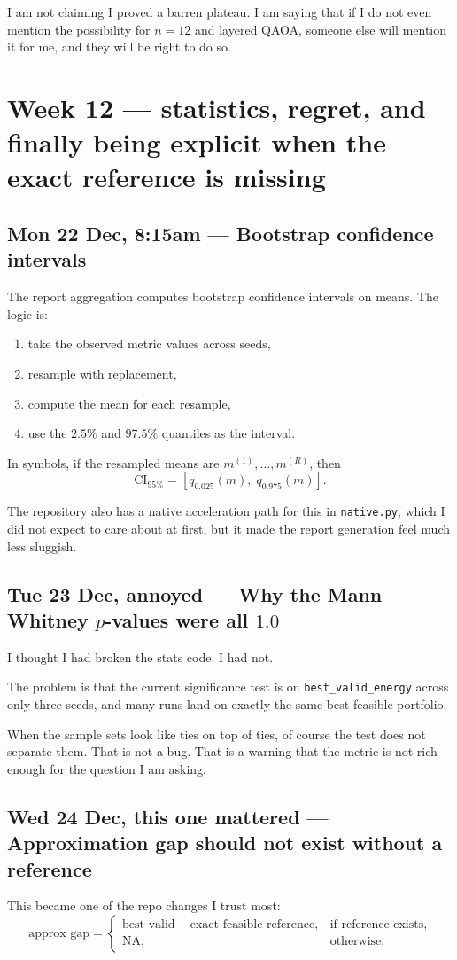 \documentclass[11pt]{article}
\newcommand{\entry}[2]{\subsection*{#1 --- #2}}
\newcommand{\repo}[1]{\texttt{#1}}
\begin{document}
I am not claiming I proved a barren plateau.
I am saying that if I do not even mention the possibility for \(n=12\) and layered QAOA, someone
else will mention it for me, and they will be right to do so.

\section*{Week 12 --- statistics, regret, and finally being explicit when the exact reference is missing}

\entry{Mon 22 Dec, 8:15am}{Bootstrap confidence intervals}

The report aggregation computes bootstrap confidence intervals on means.
The logic is:
\begin{enumerate}[leftmargin=1.4em]
\item take the observed metric values across seeds,
\item resample with replacement,
\item compute the mean for each resample,
\item use the \(2.5\%\) and \(97.5\%\) quantiles as the interval.
\end{enumerate}

In symbols, if the resampled means are \(m^{(1)},\dots,m^{(R)}\), then
\[
\text{CI}_{95\%} = \left[q_{0.025}(m),\; q_{0.975}(m)\right].
\]

The repository also has a native acceleration path for this in \repo{native.py}, which I did not
expect to care about at first, but it made the report generation feel much less sluggish.

\entry{Tue 23 Dec, annoyed}{Why the Mann--Whitney \(p\)-values were all \(1.0\)}

I thought I had broken the stats code.
I had not.

The problem is that the current significance test is on \repo{best\_valid\_energy} across only
three seeds, and many runs land on exactly the same best feasible portfolio.

When the sample sets look like ties on top of ties, of course the test does not separate them.
That is not a bug.
That is a warning that the metric is not rich enough for the question I am asking.

\entry{Wed 24 Dec, this one mattered}{Approximation gap should not exist without a reference}

This became one of the repo changes I trust most:
\[
\text{approx gap}
=
\begin{cases}
\text{best valid} - \text{exact feasible reference}, & \text{if reference exists},\\
\text{NA}, & \text{otherwise.}
\end{cases}
\]
\end{document}
